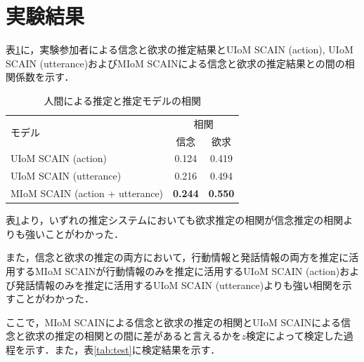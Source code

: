 \section{実験結果}

\par
表\ref{tab:cof}に，実験参加者による信念と欲求の推定結果とUIoM SCAIN (action), UIoM SCAIN (utterance)およびMIoM SCAINによる信念と欲求の推定結果との間の相関係数を示す．
\begin{table}[htb]
  \begin{center}
  \caption{人間による推定と推定モデルの相関}
  \label{tab:cof}
  \begin{tabular}{lcc} \hline
    \multirow{2}{*}{モデル}&\multicolumn{2}{c}{相関}\\\cline{2-3}
    & \hspace{10pt} 信念 \hspace{10pt} & \hspace{10pt} 欲求 \hspace{10pt} \\ \hline
    UIoM SCAIN (action)&0.124&0.419\\
    UIoM SCAIN (utterance)&0.216&0.494\\
    MIoM SCAIN (action + utterance)&\bf0.244&\bf0.550 \\\hline
  \end{tabular}
\end{center}
\end{table}


\par
表\ref{tab:cof}より，いずれの推定システムにおいても欲求推定の相関が信念推定の相関よりも強いことがわかった．

\par
また，信念と欲求の推定の両方において，行動情報と発話情報の両方を推定に活用するMIoM SCAINが行動情報のみを推定に活用するUIoM SCAIN (action)および発話情報のみを推定に活用するUIoM SCAIN (utterance)よりも強い相関を示すことがわかった．

\par
ここで，MIoM SCAINによる信念と欲求の推定の相関とUIoM SCAINによる信念と欲求の推定の相関との間に差があると言えるかを$z$検定\cite{alma9926301497204034}によって検定した過程を示す．また，表\ref{tab:test}に検定結果を示す．

